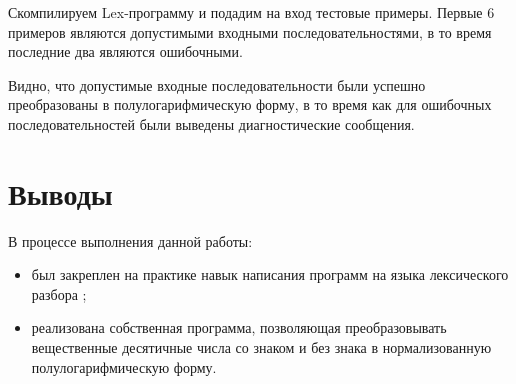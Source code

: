 
Скомпилируем Lex-программу и подадим на вход тестовые примеры. Первые 6 примеров являются допустимыми входными последовательностями, в то время последние два являются ошибочными.


Видно, что допустимые входные последовательности были успешно преобразованы в полулогарифмическую форму, в то время как для ошибочных последовательностей были выведены диагностические сообщения.

\section{Выводы}

В процессе выполнения данной работы:

\begin{itemize}
	\item был закреплен на практике навык написания программ на языка лексического разбора ;
	\item реализована собственная программа, позволяющая преобразовывать вещественные десятичные числа со знаком и без знака в нормализованную полулогарифмическую форму.
\end{itemize}


